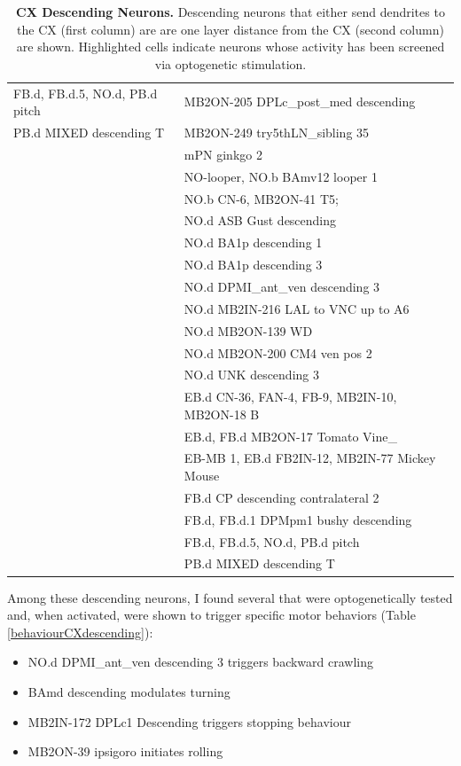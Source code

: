 \begin{table}[H]
{\begin{tabular}{p{}|p{}}
        FB.d, FB.d.5, NO.d, PB.d pitch & MB2ON-205 DPLc\_post\_med descending \\
        PB.d MIXED descending T & MB2ON-249 try5thLN\_sibling 35 \\
        & mPN ginkgo 2 \\
        & NO-looper, NO.b BAmv12 looper 1 \\
        & NO.b CN-6, MB2ON-41 T5; \\
        & NO.d ASB Gust descending \\
        & NO.d BA1p descending 1 \\
        & NO.d BA1p descending 3 \\
        & \cellcolor{cxhl} NO.d DPMI\_ant\_ven descending 3 \\
        & NO.d MB2IN-216 LAL to VNC up to A6 \\
        & NO.d MB2ON-139 WD \\
        & NO.d MB2ON-200 CM4 ven pos 2 \\
        & NO.d UNK descending 3 \\
        & EB.d CN-36, FAN-4, FB-9, MB2IN-10, MB2ON-18 B \\
        & EB.d, FB.d MB2ON-17 Tomato Vine\_ \\
        & EB-MB 1, EB.d FB2IN-12, MB2IN-77 Mickey Mouse \\
        & FB.d CP descending contralateral 2 \\
        & FB.d, FB.d.1 DPMpm1 bushy descending \\
        & FB.d, FB.d.5, NO.d, PB.d pitch \\
        & PB.d MIXED descending T \\
        \bottomrule
    \end{tabular}%
    }
    \caption[CX Descending Neurons]{\textbf{CX Descending Neurons.} Descending neurons that either send dendrites to the CX (first column) are are one layer distance from the CX (second column) are shown. Highlighted cells indicate neurons whose activity has been screened via optogenetic stimulation.}
    \label{CXDescending}
\end{table}


   Among these descending neurons, I found several that were optogenetically tested and, when activated, were shown to trigger specific motor behaviors (Table \ref{behaviourCXdescending}): 
    \begin{itemize}
        \item NO.d DPMI\_ant\_ven descending 3 triggers backward crawling
        \item BAmd descending modulates turning
        \item MB2IN-172 DPLc1 Descending triggers stopping behaviour
        \item MB2ON-39 ipsigoro initiates rolling 
    \end{itemize}

